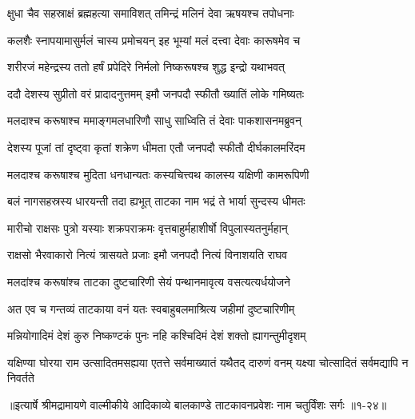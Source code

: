 \twolineshloka
{क्षुधा चैव सहस्राक्षं ब्रह्महत्या समाविशत्}
{तमिन्द्रं मलिनं देवा ऋषयश्च तपोधनाः} %

\twolineshloka
{कलशैः स्नापयामासुर्मलं चास्य प्रमोचयन्}
{इह भूम्यां मलं दत्त्वा देवाः कारूषमेव च} %

\twolineshloka
{शरीरजं महेन्द्रस्य ततो हर्षं प्रपेदिरे}
{निर्मलो निष्करूषश्च शुद्ध इन्द्रो यथाभवत्} %

\twolineshloka
{ददौ देशस्य सुप्रीतो वरं प्रादादनुत्तमम्}
{इमौ जनपदौ स्फीतौ ख्यातिं लोके गमिष्यतः} %

\twolineshloka
{मलदाश्च करूषाश्च ममाङ्गमलधारिणौ}
{साधु साध्विति तं देवाः पाकशासनमब्रुवन्} %

\twolineshloka
{देशस्य पूजां तां दृष्ट्वा कृतां शक्रेण धीमता}
{एतौ जनपदौ स्फीतौ दीर्घकालमरिंदम} %

\twolineshloka
{मलदाश्च करूषाश्च मुदिता धनधान्यतः}
{कस्यचित्त्वथ कालस्य यक्षिणी कामरूपिणी} %

\twolineshloka
{बलं नागसहस्रस्य धारयन्ती तदा ह्यभूत्}
{ताटका नाम भद्रं ते भार्या सुन्दस्य धीमतः} %

\twolineshloka
{मारीचो राक्षसः पुत्रो यस्याः शक्रपराक्रमः}
{वृत्तबाहुर्महाशीर्षो विपुलास्यतनुर्महान्} %

\twolineshloka
{राक्षसो भैरवाकारो नित्यं त्रासयते प्रजाः}
{इमौ जनपदौ नित्यं विनाशयति राघव} %

\twolineshloka
{मलदांश्च करूषांश्च ताटका दुष्टचारिणी}
{सेयं पन्थानमावृत्य वसत्यत्यर्धयोजने} %

\twolineshloka
{अत एव च गन्तव्यं ताटकाया वनं यतः}
{स्वबाहुबलमाश्रित्य जहीमां दुष्टचारिणीम्} %

\twolineshloka
{मन्नियोगादिमं देशं कुरु निष्कण्टकं पुनः}
{नहि कश्चिदिमं देशं शक्तो ह्यागन्तुमीदृशम्} %

\threelineshloka
{यक्षिण्या घोरया राम उत्सादितमसह्यया}
{एतत्ते सर्वमाख्यातं यथैतद् दारुणं वनम्}
{यक्ष्या चोत्सादितं सर्वमद्यापि न निवर्तते} %


॥इत्यार्षे श्रीमद्रामायणे वाल्मीकीये आदिकाव्ये बालकाण्डे ताटकावनप्रवेशः नाम चतुर्विंशः सर्गः ॥१-२४॥
